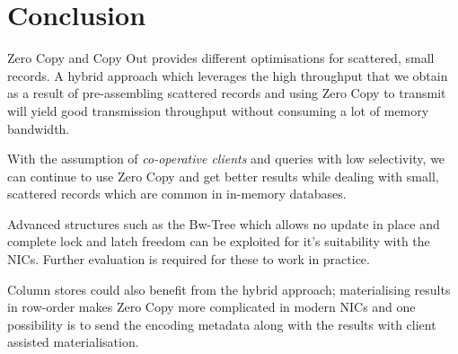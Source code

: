 \section{Conclusion}
Zero Copy and Copy Out provides different optimisations for scattered, small records. A hybrid approach 
which leverages the high throughput that we obtain as a result of pre-assembling scattered records and 
using Zero Copy to transmit will yield good transmission throughput without consuming a lot of memory bandwidth.
\begin{myitemize}
\item With the assumption of {\em co-operative clients} and queries with low selectivity, we can continue 
to use Zero Copy and get better results while dealing with small, scattered records which are common in in-memory databases.
\item Advanced structures such as the Bw-Tree which allows no update in place and complete lock and latch freedom 
can be exploited for it's suitability with the NICs. Further evaluation is required for these to work in practice.
\item Column stores could also benefit from the hybrid approach; materialising results in row-order makes Zero Copy 
more complicated in modern NICs and one possibility is to send the encoding metadata along with the results with client assisted 
materialisation.
\end{myitemize}
\newpage




